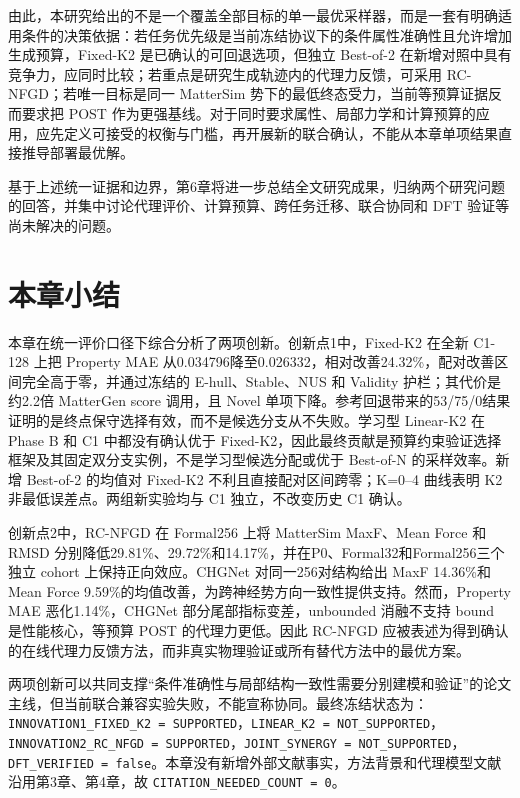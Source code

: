 由此，本研究给出的不是一个覆盖全部目标的单一最优采样器，而是一套有明确适用条件的决策依据：若任务优先级是当前冻结协议下的条件属性准确性且允许增加生成预算，Fixed-K2 是已确认的可回退选项，但独立 Best-of-2 在新增对照中具有竞争力，应同时比较；若重点是研究生成轨迹内的代理力反馈，可采用 RC-NFGD；若唯一目标是同一 Matter\allowbreak Sim 势下的最低终态受力，当前等预算证据反而要求把 POST 作为更强基线。对于同时要求属性、局部力学和计算预算的应用，应先定义可接受的权衡与门槛，再开展新的联合确认，不能从本章单项结果直接推导部署最优解。

基于上述统一证据和边界，第6章将进一步总结全文研究成果，归纳两个研究问题的回答，并集中讨论代理评价、计算预算、跨任务迁移、联合协同和 DFT 验证等尚未解决的问题。

\section{本章小结}

本章在统一评价口径下综合分析了两项创新。创新点1中，Fixed-K2 在全新 C1-128 上把 Property MAE 从0.034796降至0.026332，相对改善24.32\%，配对改善区间完全高于零，并通过冻结的 E-hull、Stable、NUS 和 Validity 护栏；其代价是约2.2倍 MatterGen score 调用，且 Novel 单项下降。参考回退带来的53/75/0结果证明的是终点保守选择有效，而不是候选分支从不失败。学习型 Linear-K2 在 Phase B 和 C1 中都没有确认优于 Fixed-K2，因此最终贡献是预算约束验证选择框架及其固定双分支实例，不是学习型候选分配或优于 Best-of-N 的采样效率。新增 Best-of-2 的均值对 Fixed-K2 不利且直接配对区间跨零；K=0--4 曲线表明 K2 非最低误差点。两组新实验均与 C1 独立，不改变历史 C1 确认。

创新点2中，RC-NFGD 在 Formal256 上将 Matter\allowbreak Sim MaxF、Mean Force 和 RMSD 分别降低29.81\%、29.72\%和14.17\%，并在P0、Formal\allowbreak 32和Formal256三个独立 cohort 上保持正向效应。CHGNet 对同一256对结构给出 MaxF 14.36\%和 Mean Force 9.59\%的均值改善，为跨神经势方向一致性提供支持。然而，Property MAE 恶化1.14\%，CHGNet 部分尾部指标变差，unbounded 消融不支持 bound 是性能核心，等预算 POST 的代理力更低。因此 RC-NFGD 应被表述为得到确认的在线代理力反馈方法，而非真实物理验证或所有替代方法中的最优方案。

两项创新可以共同支撑``条件准确性与局部结构一致性需要分别建模和验证''的论文主线，但当前联合兼容实验失败，不能宣称协同。最终冻结状态为：\texttt{INNOVATION1\_FIXED\_K2\ =\ SUP\allowbreak PORTED}，\texttt{LINEAR\_K2\ =\ NOT\_SUP\allowbreak PORTED}，\texttt{INNOVATION2\_RC\_NFGD\ =\ SUP\allowbreak PORTED}，\texttt{JOINT\_SYNERGY\ =\ NOT\_SUP\allowbreak PORTED}，\texttt{DFT\_VERIFIED\ =\ false}。本章没有新增外部文献事实，方法背景和代理模型文献沿用第3章、第4章，故 \texttt{CITATION\_NEEDED\_COUNT\ =\ 0}。
